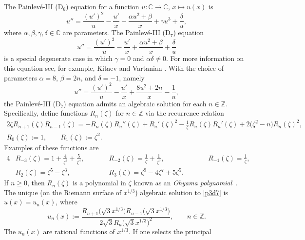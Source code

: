 \documentclass[pdftex]{sigma}
\numberwithin{equation}{section}
\begin{document}
The Painlev\'e-III (D$_6$) equation for a function
$u\colon\mathbb{C}\to\mathbb{C}$, $x\mapsto u(x)$ is
\begin{equation*}
u'' = \frac{(u')^2}{u}-\frac{u'}{x}+\frac{\alpha u^2+\beta}{x}+\gamma u^3+\frac{\delta}{u},
\end{equation*}
where $\alpha,\beta,\gamma,\delta\in\mathbb{C}$ are parameters.
The Painlev\'e-III (D$_7$) equation
\begin{equation*}
u'' = \frac{(u')^2}{u}-\frac{u'}{x}+\frac{\alpha u^2+\beta}{x}+\frac{\delta}{u}
\end{equation*}
is a special degenerate case in which $\gamma=0$ and $\alpha\delta\neq 0$.
For more information on this equation see, for example, Kitaev and Vartanian
\cite{KitaevV:2004}.
With the choice of parameters $\alpha=8$, $\beta=2n$, and $\delta=-1$, namely
\begin{equation}
\label{p3d7}
u'' = \frac{(u')^2}{u}-\frac{u'}{x}+\frac{8u^2+2n}{x}-\frac{1}{u},
\end{equation}
the Painlev\'e-III (D$_7$) equation admits an algebraic solution for each
$n\in\mathbb{Z}$.
Specifically, define functions $R_n(\zeta)$ for $n\in\mathbb{Z}$ via
the recurrence relation
\begin{gather*}
 2\zeta R_{n+1}(\zeta)R_{n-1}(\zeta) = -R_n(\zeta)R_n''(\zeta)+R_n'(\zeta)^2
-\frac{1}{\zeta}R_n(\zeta)R_n'(\zeta)+2\bigl(\zeta^2-n\bigr)R_n(\zeta)^2, \\
 R_0(\zeta):=1, \qquad R_1(\zeta):=\zeta^2.
\end{gather*}
Examples of these functions are
\begin{alignat*}{4}
& R_{-3}(\zeta) = 1 + \frac{4}{\zeta^2} + \frac{5}{\zeta^4}, \qquad &&
R_{-2}(\zeta) = \frac{1}{\zeta} + \frac{1}{\zeta^3}, \qquad &&
R_{-1}(\zeta) = \frac{1}{\zeta},& \\
& R_2(\zeta) = \zeta^5-\zeta^3, \qquad &&
R_3(\zeta) = \zeta^9 - 4\zeta^7 + 5\zeta^5. \qquad &
\end{alignat*}
If $n\geq 0$, then $R_n(\zeta)$ is a polynomial in $\zeta$ known as an
\emph{Ohyama polynomial}~\cite{Ohyama:2006}. The unique \big(on the Riemann surface of $x^{1/3}$\big) algebraic solution to
\eqref{p3d7} is $u(x)=u_n(x)$, where
\begin{equation*}
u_n(x) := \frac{R_{n+1}\bigl(\sqrt{3}x^{1/3}\bigr)R_{n-1}\bigl(\sqrt{3}x^{1/3}\bigr)}{2\sqrt{3}R_n\bigl(\sqrt{3}x^{1/3}\bigr)^2},
\qquad n\in\mathbb{Z}.
\end{equation*}
The $u_n(x)$ are rational functions of $x^{1/3}$. If one selects the principal
\end{document}
